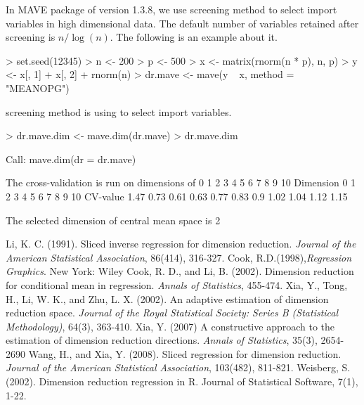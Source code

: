 \documentclass{article}
\begin{document}
In MAVE package of version 1.3.8, we use screening method to select import variables in high dimensional data. The default number of variables retained after screening is $n/\log(n)$. The following is an example about it.
\begin{Schunk}
\begin{Sinput}
> set.seed(12345)
> n <- 200
> p <- 500
> x <- matrix(rnorm(n * p), n, p)
> y <- x[, 1] + x[, 2] + rnorm(n)
> dr.mave <- mave(y ~ x, method = "MEANOPG")
\end{Sinput}
\begin{Soutput}
screening method is using to select import variables.
\end{Soutput}
\begin{Sinput}
> dr.mave.dim <- mave.dim(dr.mave)
> dr.mave.dim
\end{Sinput}
\begin{Soutput}
Call:
mave.dim(dr = dr.mave)

The cross-validation is run on dimensions of 0 1 2 3 4 5 6 7 8 9 10 
Dimension	0 	1 	2 	3 	4 	5 	6 	7 	8 	9 	10 	
CV-value	1.47 	0.73 	0.61 	0.63 	0.77 	0.83 	0.9 	1.02 	1.04 	1.12 	1.15 	

The selected dimension of  central mean space  is  2
\end{Soutput}
\end{Schunk}
\begin{thebibliography}{9}
Li, K. C. (1991). Sliced inverse regression for dimension reduction. \textit{Journal of the American Statistical Association}, 86(414), 316-327.
Cook, R.D.(1998),\textit{Regression Graphics}. New York: Wiley
Cook, R. D., and Li, B. (2002). Dimension reduction for conditional mean in regression. \textit{Annals of Statistics}, 455-474.
  Xia, Y., Tong, H., Li, W. K., and Zhu, L. X. (2002). An adaptive estimation of dimension reduction space. \textit{Journal of the Royal Statistical Society: Series B (Statistical Methodology)}, 64(3), 363-410.
Xia, Y. (2007) A constructive approach to the estimation of dimension reduction directions.  \textit{Annals of Statistics}, 35(3), 2654-2690
 Wang, H., and Xia, Y. (2008). Sliced regression for dimension reduction. \textit{Journal of the American Statistical Association}, 103(482), 811-821.
Weisberg, S. (2002). Dimension reduction regression in R. Journal of Statistical Software, 7(1), 1-22.
\end{thebibliography}
\end{document}
